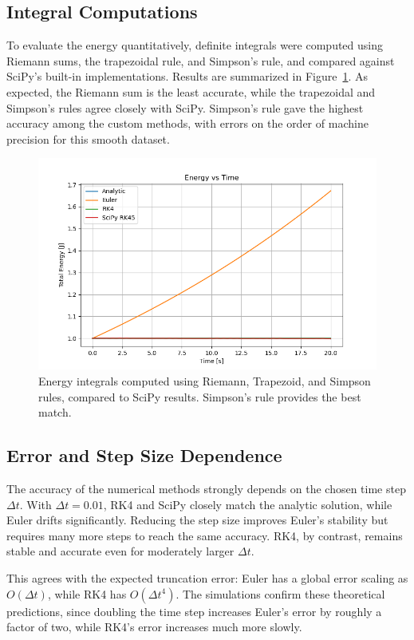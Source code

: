 \documentclass[12pt]{article}
\begin{document}
\subsection{Integral Computations}
To evaluate the energy quantitatively, definite integrals were computed using Riemann sums, the trapezoidal rule, and Simpson's rule, and compared against SciPy's built-in implementations. Results are summarized in Figure~\ref{fig:integrals}. As expected, the Riemann sum is the least accurate, while the trapezoidal and Simpson's rules agree closely with SciPy. Simpson's rule gave the highest accuracy among the custom methods, with errors on the order of machine precision for this smooth dataset.

\begin{figure}[h!]
    \centering
    \includegraphics[width=1\textwidth]{Figure_3.png}
    \caption{Energy integrals computed using Riemann, Trapezoid, and Simpson rules, compared to SciPy results. Simpson's rule provides the best match.}
    \label{fig:integrals}
\end{figure}

\subsection{Error and Step Size Dependence}
The accuracy of the numerical methods strongly depends on the chosen time step $\Delta t$. With $\Delta t = 0.01$, RK4 and SciPy closely match the analytic solution, while Euler drifts significantly. Reducing the step size improves Euler's stability but requires many more steps to reach the same accuracy. RK4, by contrast, remains stable and accurate even for moderately larger $\Delta t$. 

This agrees with the expected truncation error: Euler has a global error scaling as $O(\Delta t)$, while RK4 has $O(\Delta t^4)$. The simulations confirm these theoretical predictions, since doubling the time step increases Euler's error by roughly a factor of two, while RK4's error increases much more slowly.
\end{document}
